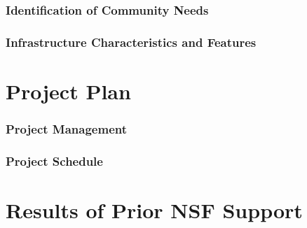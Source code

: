 \section{Identification of Community Needs}
\label{sec:needs}


\section{Infrastructure Characteristics and Features}
\label{sec:tools}


\newpage
\part{Project Plan}


\section{Project Management}
\label{sec:mgmt}


\section{Project Schedule}
\label{sec:sched}



\part{Results of Prior NSF Support}


